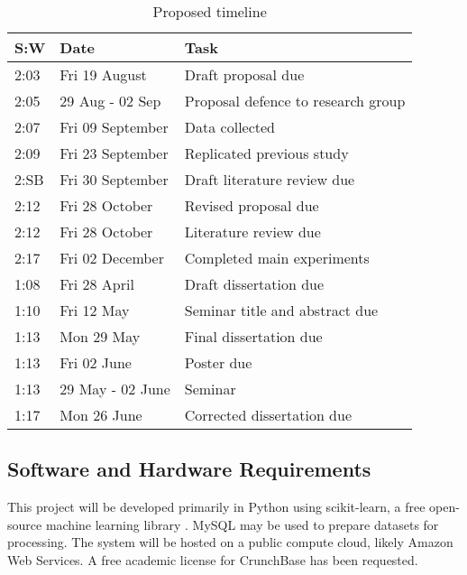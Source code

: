 \documentclass[12pt, a4paper]{article}
\begin{document}
\begin{table}[!h]
  \centering
    \begin{tabular}{l|l|l}
    \toprule
    \textbf{S:W} & \textbf{Date} & \textbf{Task} \\
    \midrule
    {2:03} & Fri 19 August & Draft proposal due \\
    {2:05} & 29 Aug - 02 Sep & Proposal defence to research group \\
    {2:07} & Fri 09 September & Data collected \\
    {2:09} & Fri 23 September & Replicated previous study \\
    {2:SB} & Fri 30 September & Draft literature review due \\
    {2:12} & Fri 28 October & Revised proposal due \\
    {2:12} & Fri 28 October & Literature review due \\
    {2:17} & Fri 02 December & Completed main experiments \\
    {1:08} & Fri 28 April & Draft dissertation due \\
    {1:10} & Fri 12 May & Seminar title and abstract due \\
    {1:13} & Mon 29 May & Final dissertation due \\
    {1:13} & Fri 02 June & Poster due \\
    {1:13} & 29 May - 02 June & Seminar \\
    {1:17} & Mon 26 June & Corrected dissertation due \\
    \bottomrule
    \end{tabular}%
  \caption{Proposed timeline}
  \label{tab:timeline}%
\end{table}%

\subsection*{Software and Hardware Requirements}

This project will be developed primarily in Python using scikit-learn, a free open-source machine learning library \cite{scikitlearn}. MySQL may be used to prepare datasets for processing. The system will be hosted on a public compute cloud, likely Amazon Web Services. A free academic license for CrunchBase has been requested.
\end{document}
